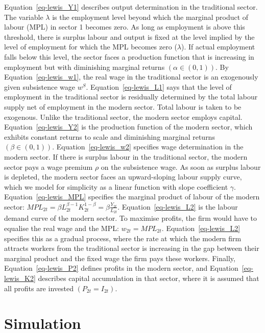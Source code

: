 \documentclass[
  letterpaper,
  DIV=11,
  numbers=noendperiod]{scrreprt}
\begin{document}
Equation~\ref{eq-lewis_Y1} describes output determination in the
traditional sector. The variable \(\lambda\) is the employment level
beyond which the marginal product of labour (MPL) in sector 1 becomes
zero. As long as employment is above this threshold, there is surplus
labour and output is fixed at the level implied by the level of
employment for which the MPL becomes zero (\(\lambda\)). If actual
employment falls below this level, the sector faces a production
function that is increasing in employment but with diminishing marginal
returns \((\alpha \in (0,1))\). By Equation~\ref{eq-lewis_w1}, the real
wage in the traditional sector is an exogenously given subsistence wage
\(w^S\). Equation~\ref{eq-lewis_L1} says that the level of employment in
the traditional sector is residually determined by the total labour
supply net of employment in the modern sector. Total labour is taken to
be exogenous. Unlike the traditional sector, the modern sector employs
capital. Equation~\ref{eq-lewis_Y2} is the production function of the
modern sector, which exhibits constant returns to scale and diminishing
marginal returns \((\beta\in (0,1))\). Equation~\ref{eq-lewis_w2}
specifies wage determination in the modern sector. If there is surplus
labour in the traditional sector, the modern sector pays a wage premium
\(\rho\) on the subsistence wage. As soon as surplus labour is depleted,
the modern sector faces an upward-sloping labour supply curve, which we
model for simplicity as a linear function with slope coefficient
\(\gamma\). Equation~\ref{eq-lewis_MPL} specifies the marginal product
of labour of the modern sector:
\(MPL_{2t}=\beta L_{2t}^{\beta-1} K_{2t}^{1-\beta} = \beta \frac{Y_{2t}}{L_{2t}}\).
Equation~\ref{eq-lewis_L2} is the labour demand curve of the modern
sector. To maximise profits, the firm would have to equalise the real
wage and the MPL: \(w_{2t}=MPL_{2t}\). Equation~\ref{eq-lewis_L2}
specifies this as a gradual process, where the rate at which the modern
firm attracts workers from the traditional sector is increasing in the
gap between their marginal product and the fixed wage the firm pays
these workers. Finally, Equation~\ref{eq-lewis_P2} defines profits in
the modern sector, and Equation~\ref{eq-lewis_K2} describes capital
accumulation in that sector, where it is assumed that all profits are
invested \((P_{2t}=I_{2t})\).

\section{Simulation}\label{simulation-12}
\end{document}
